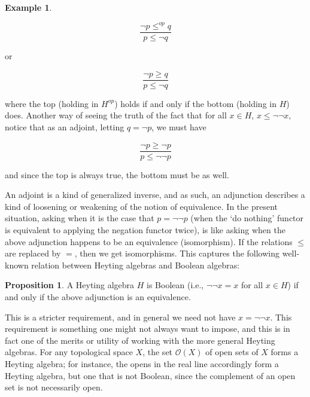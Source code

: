 \documentclass[a4paper]{book}
\theoremstyle{definition}
\newtheorem{example}{Example}[section]
\theoremstyle{definition}
\theoremstyle{definition}
\newtheorem{proposition}{Proposition}[section]
\theoremstyle{theorem}
\theoremstyle{definition}
\begin{document}
\begin{example}
	\begin{center} 
		\begin{equation*}
		\frac{\neg p \leq^{op} q}{p \leq \neg q}
		\end{equation*}
	\end{center} 
	or 
	\begin{center} 
		\begin{equation*}
		\frac{\neg p \geq q}{p \leq \neg q}
		\end{equation*}
	\end{center} 
	where the top (holding in $H^{op}$) holds if and only if the bottom (holding in $H$) does. Another way of seeing the truth of the fact that for all $x \in H$, $x \leq \neg \neg x$, notice that as an adjoint, letting $q = \neg p$, we must have 
	\begin{center} 
		\begin{equation*}
		\frac{\neg p \geq \neg p}{p \leq \neg \neg p}
		\end{equation*}
	\end{center} 
	and since the top is always true, the bottom must be as well. \par 
	An adjoint is a kind of generalized inverse, and as such, an adjunction describes a kind of loosening or weakening of the notion of equivalence. In the present situation, asking when it is the case that $p = \neg \neg p$ (when the `do nothing' functor is equivalent to applying the negation functor twice), is like asking when the above adjunction happens to be an equivalence (isomorphism). If the relations $\leq$ are replaced by $=$, then we get isomorphisms. This captures the following well-known relation between Heyting algebras and Boolean algebras: 
	\begin{proposition}
		A Heyting algebra $H$ is Boolean (i.e., $\neg \neg x = x$ for all $x \in H$) if and only if the above adjunction is an equivalence. 
	\end{proposition} \noindent 
This is a stricter requirement, and in general we need not have $x = \neg \neg x$. This requirement is something one might not always want to impose, and this is in fact one of the merits or utility of working with the more general Heyting algebras. For any topological space $X$, the set $\mathscr{O}(X)$ of open sets of $X$ forms a Heyting algebra; for instance, the opens in the real line accordingly form a Heyting algebra, but one that is not Boolean, since the complement of an open set is not necessarily open. \par 

\end{example}
\end{document}
